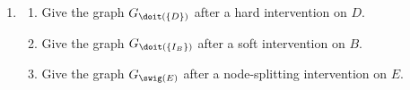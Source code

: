 \begin{enumerate}[label=7.\arabic*]
\begin{enumerate}
        Check that your answers agree with Lemma \ref*{marginalizations-commute}.
        \item
        \begin{enumerate}
            \item Give the graph $G_{\doit(\{D\})}$ after a hard intervention on $D$.
            \item Give the graph $G_{\doit(\{I_B\})}$ after a soft intervention on $B$.
            \item Give the graph $G_{\swig(E)}$ after a node-splitting intervention on $E$.
        \end{enumerate}
    \end{enumerate}


\end{enumerate}
